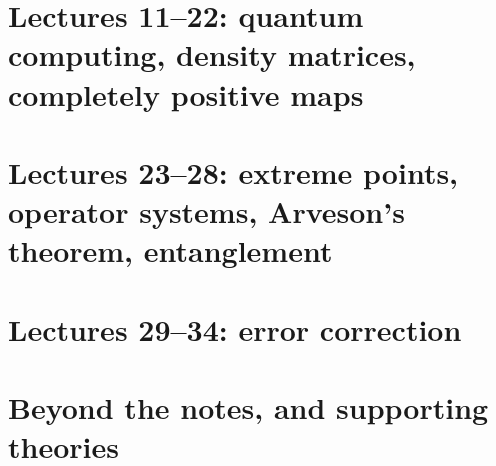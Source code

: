 \documentclass[11pt,a4paper]{article}
\theoremstyle{definition}
\begin{document}
\part{Lectures 11--22: quantum computing, density matrices, completely positive maps}
































\part{Lectures 23--28: extreme points, operator systems, Arveson's theorem, entanglement}














\part{Lectures 29--34: error correction}















\part{Beyond the notes, and supporting theories}







\end{document}
